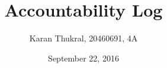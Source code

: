 \documentclass[12pt]{article}
\title{Accountability Log}
\author{Karan Thukral, 20460691, 4A}
\date{September 22, 2016}
\begin{document}
	\makereporttitle
	\startarabicpagenumbers
	
\end{document}
